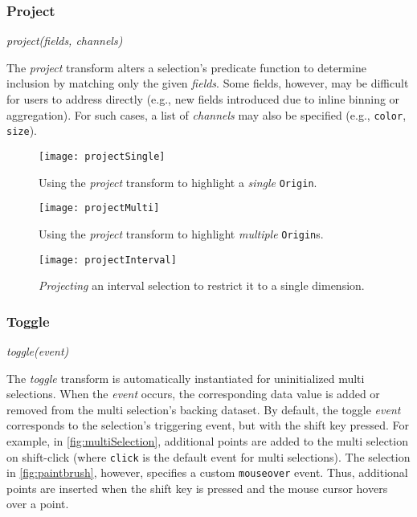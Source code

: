 
\subsubsection{Project}

\centerline{\emph{project(fields, channels)}}

The \emph{project} transform alters a selection's predicate function to
determine inclusion by matching only the given \emph{fields}. Some fields,
however, may be difficult for users to address directly (e.g., new fields
introduced due to inline binning or aggregation). For such cases, a list of
\emph{channels} may also be specified (e.g., \texttt{color}, \texttt{size}).

\begin{figure}[h!]
  \centering
  \texttt{[image: projectSingle]}
  \caption{Using the \emph{project} transform to highlight a \emph{single}
  \texttt{Origin}.}
  \label{fig:projectSingle}
\end{figure}

\begin{figure}[h!]
  \centering
  \texttt{[image: projectMulti]}
  \caption{Using the \emph{project} transform to highlight \emph{multiple}
  \texttt{Origin}s.}
  \label{fig:projectMulti}
\end{figure}

\begin{figure}[h!]
  \centering
  \texttt{[image: projectInterval]}
  \caption{\emph{Projecting} an interval selection to restrict it to a
  single dimension.}
  \label{fig:projectInterval}
\end{figure}

\subsubsection{Toggle}

\centerline{\emph{toggle(event)}}

The \emph{toggle} transform is automatically instantiated for uninitialized
multi selections. When the \emph{event} occurs, the corresponding data value is
added or removed from the multi selection's backing dataset. By default, the
toggle \emph{event} corresponds to the selection's triggering event, but with
the shift key pressed. For example, in \cref{fig:multiSelection}, additional
points are added to the multi selection on shift-click (where \texttt{click} is
the default event for multi selections). The selection in \cref{fig:paintbrush},
however, specifies a custom \texttt{mouseover} event. Thus, additional points
are inserted when the shift key is pressed and the mouse cursor hovers over a
point.

